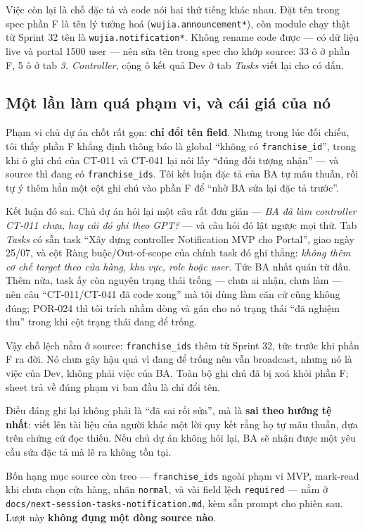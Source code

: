 Việc còn lại là chỗ đặc tả và code nói hai thứ tiếng khác nhau. Đặt tên trong spec phần F là tên lý
tưởng hoá (\texttt{wujia.announcement*}), còn module chạy thật từ Sprint 32 tên là
\texttt{wujia.notification*}. Không rename code được --- có dữ liệu live và portal 1500 user --- nên
sửa tên trong spec cho khớp source: 33 ô ở phần F, 5 ô ở tab \emph{3. Controller}, cộng ô kết quả
Dev ở tab \emph{Tasks} viết lại cho có dấu.

\subsection{Một lần làm quá phạm vi, và cái giá của nó}

Phạm vi chủ dự án chốt rất gọn: \textbf{chỉ đổi tên field}. Nhưng trong lúc đối chiếu, tôi thấy phần
F khẳng định thông báo là global ``không có \texttt{franchise\_id}'', trong khi ô ghi chú của CT-011
và CT-041 lại nói lấy ``đúng đối tượng nhận'' --- và source thì đang có
\texttt{franchise\_ids}. Tôi kết luận đặc tả của BA tự mâu thuẫn, rồi tự ý thêm hẳn một cột ghi chú
vào phần F để ``nhờ BA sửa lại đặc tả trước''.

Kết luận đó sai. Chủ dự án hỏi lại một câu rất đơn giản --- \emph{BA đã làm controller CT-011 chưa,
hay cái đó ghi theo GPT?} --- và câu hỏi đó lật ngược mọi thứ. Tab \emph{Tasks} có sẵn task
``Xây dựng controller Notification MVP cho Portal'', giao ngày 25/07, và cột Ràng buộc/Out-of-scope
của chính task đó ghi thẳng: \emph{không thêm cơ chế target theo cửa hàng, khu vực, role hoặc user}.
Tức BA nhất quán từ đầu. Thêm nữa, task ấy còn nguyên trạng thái trống --- chưa ai nhận, chưa làm ---
nên câu ``CT-011/CT-041 đã code xong'' mà tôi dùng làm căn cứ cũng không đúng; POR-024 thì tôi trích
nhầm dòng và gán cho nó trạng thái ``đã nghiệm thu'' trong khi cột trạng thái đang để trống.

Vậy chỗ lệch nằm ở source: \texttt{franchise\_ids} thêm từ Sprint 32, tức trước khi phần F ra đời.
Nó chưa gây hậu quả vì đang để trống nên vẫn broadcast, nhưng nó là việc của Dev, không phải việc
của BA. Toàn bộ ghi chú đã bị xoá khỏi phần F; sheet trả về đúng phạm vi ban đầu là chỉ đổi tên.

Điều đáng ghi lại không phải là ``đã sai rồi sửa'', mà là \textbf{sai theo hướng tệ nhất}: viết lên
tài liệu của người khác một lời quy kết rằng họ tự mâu thuẫn, dựa trên chứng cứ đọc thiếu. Nếu chủ
dự án không hỏi lại, BA sẽ nhận được một yêu cầu sửa đặc tả mà lẽ ra không tồn tại.

Bốn hạng mục source còn treo --- \texttt{franchise\_ids} ngoài phạm vi MVP, mark-read khi chưa chọn
cửa hàng, nhãn \texttt{normal}, và vài field lệch \texttt{required} --- nằm ở
\texttt{docs/next-session-tasks-notification.md}, kèm sẵn prompt cho phiên sau. Lượt này
\textbf{không đụng một dòng source nào}.

